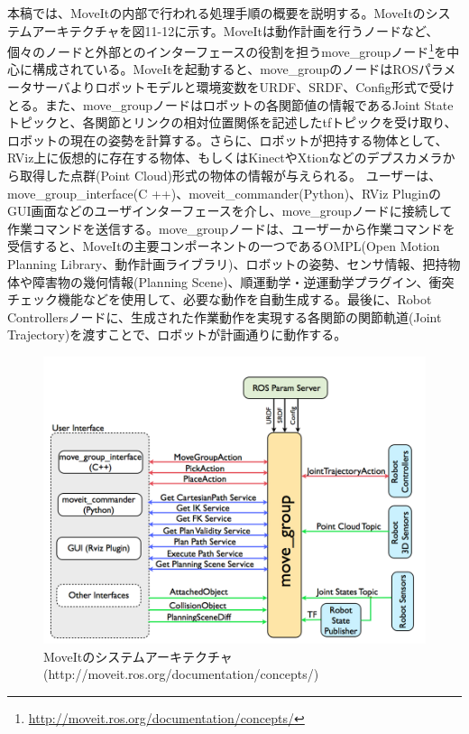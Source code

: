 本稿では、MoveItの内部で行われる処理手順の概要を説明する。MoveItのシステムアーキテクチャを図11-12に示す。MoveItは動作計画を行うノードなど、個々のノードと外部とのインターフェースの役割を担うmove\_groupノード\footnote{\url{http://moveit.ros.org/documentation/concepts/}}を中心に構成されている。MoveItを起動すると、move\_groupのノードはROSパラメータサーバよりロボットモデルと環境変数をURDF、SRDF、Config形式で受けとる。また、move\_groupノードはロボットの各関節値の情報であるJoint Stateトピックと、各関節とリンクの相対位置関係を記述したtfトピックを受け取り、ロボットの現在の姿勢を計算する。さらに、ロボットが把持する物体として、RViz上に仮想的に存在する物体、もしくはKinectやXtionなどのデプスカメラから取得した点群(Point Cloud)形式の物体の情報が与えられる。
ユーザーは、move\_group\_interface(C ++)、moveit\_commander(Python)、RViz PluginのGUI画面などのユーザインターフェースを介し、move\_groupノードに接続して作業コマンドを送信する。move\_groupノードは、ユーザーから作業コマンドを受信すると、MoveItの主要コンポーネントの一つであるOMPL(Open Motion Planning Library、動作計画ライブラリ)、ロボットの姿勢、センサ情報、把持物体や障害物の幾何情報(Planning Scene)、順運動学・逆運動学プラグイン、衝突チェック機能などを使用して、必要な動作を自動生成する。最後に、Robot Controllersノードに、生成された作業動作を実現する各関節の関節軌道(Joint Trajectory)を渡すことで、ロボットが計画通りに動作する。

\begin{figure}[htp]
  \centering
  \includegraphics[width=12cm]{pictures/chapter11/pic_11_12.png}
  \caption{MoveItのシステムアーキテクチャ(http://moveit.ros.org/documentation/concepts/)}
\end{figure}


